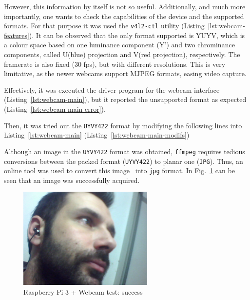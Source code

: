 However, this information by itself is not so useful. Additionally, and much
more importantly, one wants to check the capabilities of the device and the
supported formats. For that purpose it was used the \texttt{v4l2-ctl} utility
(Listing~\ref{lst:webcam-features}). It can be observed that the only format
supported is YUYV, which is a colour space based on one luminance component (Y')
and two chrominance components, called U(blue) projection and V(red projection),
respectively. The framerate is also fixed (30 fps), but with different
resolutions. This is very limitative, as the newer webcams support MJPEG
formats, easing video capture.
%

Effectively, it was executed the driver program for the webcam interface
(Listing~\ref{lst:webcam-main}), but it reported the unsupported format as
expected (Listing~\ref{lst:webcam-main-error}).
%

Then, it was tried out the \texttt{UYVY422} format by modifying the following
lines into Listing~\ref{lst:webcam-main}
(Listing~\ref{lst:webcam-main-modifs})
%

Although an image in the \texttt{UYVY422} format was obtained, \texttt{ffmpeg}
requires tedious conversions between the packed format (\texttt{UYVY422}) to
planar one (\texttt{JPG}). Thus, an online tool was used to convert this image~\cite{conv-UYVY-jpg} into \texttt{jpg} format. In Fig.~\ref{fig:rasp-cam-test-succ} can be seen that an image was
successfully acquired.
\begin{figure}[!hbt]
\centering
    \includegraphics[width=0.6\textwidth]{./img/webcam-test-success.jpg}
  \caption{Raspberry Pi 3 + Webcam test: success}%
\label{fig:rasp-cam-test-succ}
\end{figure}

